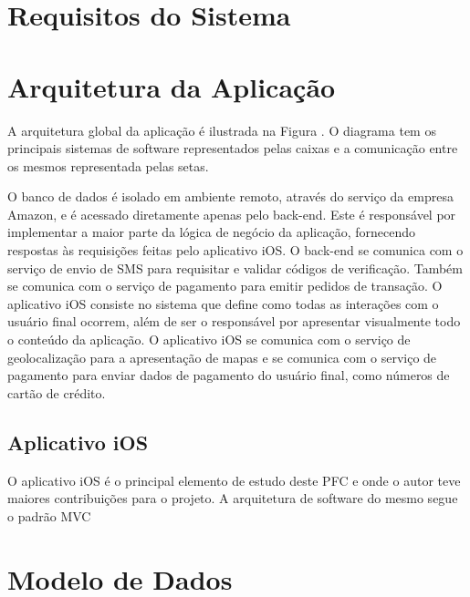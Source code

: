 \section{Requisitos do Sistema}


\section{Arquitetura da Aplicação}
A arquitetura global da aplicação é ilustrada na Figura . O diagrama tem os principais sistemas de software representados pelas caixas e a comunicação entre os mesmos representada pelas setas. 

O banco de dados é isolado em ambiente remoto, através do serviço da empresa Amazon, e é acessado diretamente apenas pelo back-end. Este é responsável por implementar a maior parte da lógica de negócio da aplicação, fornecendo respostas às requisições feitas pelo aplicativo iOS. O back-end se comunica com o serviço de envio de SMS para requisitar e validar códigos de verificação. Também se comunica com o serviço de pagamento para emitir pedidos de transação. O aplicativo iOS consiste no sistema que define como todas as interações com o usuário final ocorrem, além de ser o responsável por apresentar visualmente todo o conteúdo da aplicação. O aplicativo iOS se comunica com o serviço de geolocalização para a apresentação de mapas e se comunica com o serviço de pagamento para enviar dados de pagamento do usuário final, como números de cartão de crédito.


\subsection{Aplicativo iOS}
O aplicativo iOS é o principal elemento de estudo deste PFC e onde o autor teve maiores contribuições para o projeto. A arquitetura de software do mesmo segue o padrão MVC


\section{Modelo de Dados}

